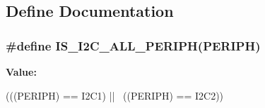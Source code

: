 \subsection{Define Documentation}
\hypertarget{group__I2C__Exported__Constants_ga2e57489a40603d6ab7ff115b94eeb303}{
\subsubsection[{IS\_\-I2C\_\-ALL\_\-PERIPH}]{\setlength{\rightskip}{0pt plus 5cm}\#define IS\_\-I2C\_\-ALL\_\-PERIPH(PERIPH)}}
\label{group__I2C__Exported__Constants_ga2e57489a40603d6ab7ff115b94eeb303}
{\bfseries Value:}
\begin{DoxyCode}
(((PERIPH) == I2C1) || \
                                   ((PERIPH) == I2C2))
\end{DoxyCode}
